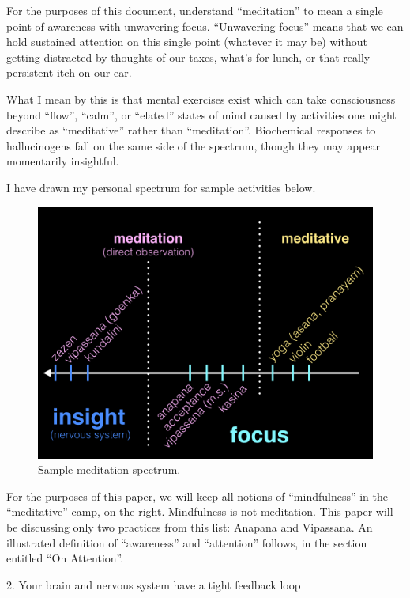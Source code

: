 \documentclass{article}
\begin{document}
For the purposes of this document, understand ``meditation'' to mean a single point of awareness with unwavering focus. ``Unwavering focus'' means that we can hold sustained attention on this single point (whatever it may be) without getting distracted by thoughts of our taxes, what's for lunch, or that really persistent itch on our ear.

What I mean by this is that mental exercises exist which can take consciousness beyond ``flow'', ``calm'', or ``elated'' states of mind caused by activities one might describe as ``meditative'' rather than ``meditation''. Biochemical responses to hallucinogens fall on the same side of the spectrum, though they may appear momentarily insightful.

I have drawn my personal spectrum for sample activities below.

\begin{figure}[h]
  \includegraphics[width=\linewidth]{meditation-spectrum-1.jpeg}
  \caption{Sample meditation spectrum.}
  \label{fig:meditation-spectrum}
\end{figure}

For the purposes of this paper, we will keep all notions of “mindfulness” in the “meditative” camp, on the right. Mindfulness is not meditation. This paper will be discussing only two practices from this list: Anapana and Vipassana. An illustrated definition of “awareness” and “attention” follows, in the section entitled “On Attention”.



2. Your brain and nervous system have a tight feedback loop
\end{document}
